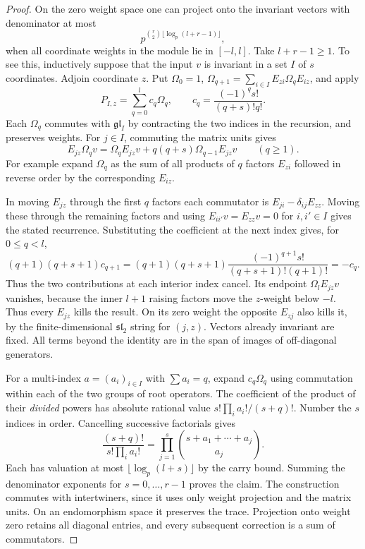 \begin{proof}
On the zero weight space one can project onto the invariant
vectors with denominator at most
\[
                  p^{\binom r2\lfloor\log_p(l+r-1)\rfloor},
\]
when all coordinate weights in the module lie in \([-l,l]\).
Take \(l+r-1\ge1\). To see this, inductively suppose that
the input \(v\) is invariant in a set \(I\) of \(s\) coordinates.
Adjoin coordinate \(z\). Put \(\Omega_0=1\),
\(\Omega_{q+1}=\sum_{i\in I}E_{zi}\Omega_q E_{iz}\),
and apply
\[
   P_{I,z}=\sum_{q=0}^l c_q\Omega_q,\qquad
   c_q=\frac{(-1)^q s!}{(q+s)!q!}.
\]
Each \(\Omega_q\) commutes with \(\mathfrak{gl}_I\) by contracting
the two indices in the recursion, and preserves weights.
For \(j\in I\), commuting the matrix units gives
\[
 E_{jz}\Omega_q v=\Omega_q E_{jz}v+
                       q(q+s)\Omega_{q-1}E_{jz}v
                 \qquad(q\ge1).
\]
For example expand \(\Omega_q\) as the sum of all products of
\(q\) factors \(E_{zi}\) followed in reverse order by the
corresponding \(E_{iz}\).

In moving \(E_{jz}\) through the
first \(q\) factors each commutator is
\(E_{ji}-\delta_{ij}E_{zz}\). Moving these through the remaining
factors and using \(E_{ii'}v=E_{zz}v=0\) for \(i,i'\in I\)
gives the stated recurrence. Substituting the coefficient at the next index gives, for \(0\le q<l\),
\[
 (q+1)(q+s+1)c_{q+1}
 =(q+1)(q+s+1)\frac{(-1)^{q+1}s!}{(q+s+1)!(q+1)!}=-c_q .
\]
Thus the two contributions at each interior index cancel.
Its endpoint \(\Omega_l E_{jz}v\) vanishes, because the inner
\(l+1\) raising factors move the \(z\)-weight below \(-l\).
Thus every \(E_{jz}\) kills the result. On its zero weight
the opposite \(E_{zj}\) also kills it, by the finite-dimensional
\(\mathfrak{sl}_2\) string for \((j,z)\). Vectors already
invariant are fixed. All terms beyond the identity are in the
span of images of off-diagonal generators.

For a multi-index \(a=(a_i)_{i\in I}\) with \(\sum a_i=q\), expand
\(c_q\Omega_q\) using commutation within each of the two groups
of root operators. The coefficient of the product of their
\emph{divided} powers has absolute rational value
\(s!\prod_i a_i!/(s+q)!\).
Number the \(s\) indices in order. Cancelling successive factorials gives
\[
 \frac{(s+q)!}{s!\prod_i a_i!}=\prod_{j=1}^s\binom{s+a_1+\cdots+a_j}{a_j}.
\]
Each has valuation at most \(\lfloor\log_p(l+s)\rfloor\)
by the carry bound. Summing the denominator exponents for
\(s=0,\ldots,r-1\) proves the claim. The construction commutes
with intertwiners, since it uses only weight projection and the
matrix units. On an endomorphism space it preserves the trace.
Projection onto weight zero retains all diagonal entries, and
every subsequent correction is a sum of commutators.


\end{proof}
